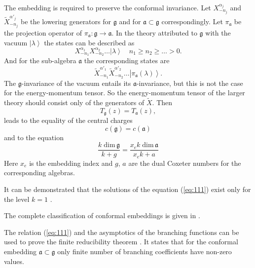 \documentclass[12pt]{iopart}
\begin{document}
The embedding is required to preserve the conformal invariance.
Let $X^{\alpha_j}_{-n_j}$ and $\tilde{X}^{\alpha'_j}_{-n_j}$ be the lowering generators for $\mathfrak{g}$ and for $\mathfrak{a}\subset\mathfrak{g}$ correspondingly. Let $\pi_{\mathfrak{a}}$ be the projection operator of $\pi_{\mathfrak{a}}:\mathfrak{g}\longrightarrow \mathfrak{a}$. In the theory attributed to $\mathfrak{g}$ with the vacuum $\left|\lambda\right>$ the states can be described as
\begin{equation}
  \label{eq:109}
  X^{\alpha_1}_{-n_1}X^{\alpha_2}_{-n_2}\dots\left|\lambda\right>\quad n_1\geq n_2\geq \dots>0.
\end{equation}
And for the sub-algebra $\mathfrak{a}$ the corresponding states are
\begin{equation}
  \label{eq:110}
  \tilde{X}^{\alpha'_1}_{-n_1}\tilde{X}^{\alpha'_2}_{-n_2}\dots\left|\pi_{\mathfrak{a}}(\lambda)\right>.
\end{equation}
The $\mathfrak{g}$-invariance of the vacuum entails its $\mathfrak{a}$-invariance, but this is not the case for the energy-momentum tensor. So the energy-momentum tensor of the larger theory should consist only of the generators of $\tilde{X}$. Then 
\begin{equation}
  \label{eq:2}
  T_{\mathfrak{g}}(z)=T_{\mathfrak{a}}(z),  
\end{equation}
leads to the equality of the central charges 
\begin{equation}
  \label{eq:33}
  c(\mathfrak{g})=c(\mathfrak{a})
\end{equation}
and to the equation
\begin{equation}
  \label{eq:111}
  \frac{k\;\mathrm{dim}\,\mathfrak{g}}{k+g}=\frac{x_e k\; \mathrm{dim}\,\mathfrak{a}}{x_ek+a}
\end{equation}
Here $x_e$ is the embedding index and $g$, $a$ are the dual Coxeter numbers for the  corresponding algebras.

It can be demonstrated that the solutions of the equation (\ref{eq:111}) exist only
for the level $k=1$ \cite{difrancesco1997cft}.

The complete classification of conformal embeddings is given in \cite{schellekens1986conformal}.

The relation (\ref{eq:111}) and the asymptotics of the branching functions can be used to prove the finite reducibility theorem \cite{kac1988modular}. It states that for the conformal embedding  $\mathfrak{a}\subset\mathfrak{g}$ only finite number of branching coefficients have non-zero values.
\end{document}
